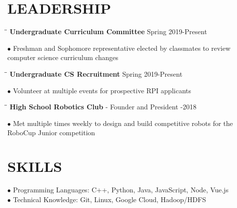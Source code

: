\documentclass{res}
\begin{document}
\begin{resume}
\section{LEADERSHIP}
	\vspace{-0.1in}
    \begin{tabbing}
   \hspace{2.3in}\= \hspace{3.4in}\= \kill
    {\bf Undergraduate Curriculum Committee} \>  \>Spring 2019-Present
   \end{tabbing}\vspace{-20pt}
	$\bullet$ Freshman and Sophomore representative elected by classmates to review computer science curriculum changes
	\vspace{-15pt}
    \begin{tabbing}
   \hspace{2.3in}\= \hspace{3.4in}\= \kill
    {\bf Undergraduate CS Recruitment} \>  \>Spring 2019-Present
   \end{tabbing}\vspace{-20pt}
	 $\bullet$ Volunteer at multiple events for prospective RPI applicants
	 \vspace{-15pt}
    \begin{tabbing}
   \hspace{2.3in}\= \hspace{4in}\= \kill
    {\bf High School Robotics Club} - Founder and President \>  -2018
   \end{tabbing}\vspace{-20pt}
	 $\bullet$ Met multiple times weekly to design and build competitive robots for the RoboCup Junior competition


\vspace{-0.1in}
\section{SKILLS}
    $\bullet$  Programming Languages: C++, Python, Java, JavaScript, Node, Vue.js\\
     $\bullet$ Technical Knowledge: Git, Linux, Google Cloud, Hadoop/HDFS


\end{resume}
\end{document}
